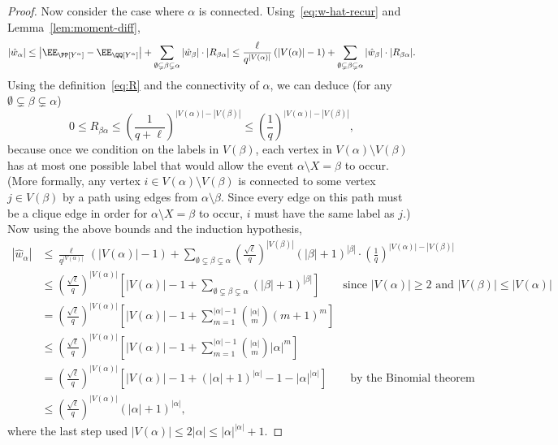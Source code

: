 \documentclass{article}
\begin{document}
\begin{proof}
Now consider the case where $\alpha$ is connected. Using~\eqref{eq:w-hat-recur} and Lemma~\ref{lem:moment-diff},
\[ |\hat{w}_\alpha| \le \left|\EE_\PP[Y^\alpha] - \EE_\QQ[Y^\alpha]\right| + \sum_{\emptyset \subsetneq \beta \subsetneq \alpha} |\hat{w}_\beta| \cdot |R_{\beta\alpha}|
\le \frac{\ell}{q^{|V(\alpha)|}} \, (|V(\alpha)|-1) + \sum_{\emptyset \subsetneq \beta \subsetneq \alpha} |\hat{w}_\beta| \cdot |R_{\beta\alpha}|. \]
Using the definition~\eqref{eq:R} and the connectivity of $\alpha$, we can deduce (for any $\emptyset \subsetneq \beta \subsetneq \alpha$)
\[ 0 \le R_{\beta\alpha} \le \left(\frac{1}{q+\ell}\right)^{|V(\alpha)| - |V(\beta)|} \le \left(\frac{1}{q}\right)^{|V(\alpha)| - |V(\beta)|}, \]
because once we condition on the labels in $V(\beta)$, each vertex in $V(\alpha) \setminus V(\beta)$ has at most one possible label that would allow the event $\alpha \setminus X = \beta$ to occur. (More formally, any vertex $i \in V(\alpha) \setminus V(\beta)$ is connected to some vertex $j \in V(\beta)$ by a path using edges from $\alpha \setminus \beta$. Since every edge on this path must be a clique edge in order for $\alpha \setminus X = \beta$ to occur, $i$ must have the same label as $j$.) Now using the above bounds and the induction hypothesis,
\begin{align*}
|\hat{w}_\alpha| &\le \frac{\ell}{q^{|V(\alpha)|}} \, (|V(\alpha)|-1) + \sum_{\emptyset \subsetneq \beta \subsetneq \alpha} \left(\frac{\sqrt\ell}{q}\right)^{|V(\beta)|}  (|\beta|+1)^{|\beta|} \cdot \left(\frac{1}{q}\right)^{|V(\alpha)| - |V(\beta)|} \\
&\le \left(\frac{\sqrt\ell}{q}\right)^{|V(\alpha)|} \left[|V(\alpha)|-1 + \sum_{\emptyset \subsetneq \beta \subsetneq \alpha} (|\beta|+1)^{|\beta|}\right] \qquad \text{since } |V(\alpha)| \ge 2 \text{ and } |V(\beta)| \le |V(\alpha)| \\
&= \left(\frac{\sqrt\ell}{q}\right)^{|V(\alpha)|} \left[|V(\alpha)|-1 + \sum_{m=1}^{|\alpha|-1} \binom{|\alpha|}{m} (m+1)^{m}\right] \\
&\le \left(\frac{\sqrt\ell}{q}\right)^{|V(\alpha)|} \left[|V(\alpha)|-1 + \sum_{m=1}^{|\alpha|-1} \binom{|\alpha|}{m} |\alpha|^{m}\right] \\
&= \left(\frac{\sqrt\ell}{q}\right)^{|V(\alpha)|} \left[|V(\alpha)|-1 + (|\alpha|+1)^{|\alpha|} - 1 - |\alpha|^{|\alpha|}\right] \qquad \text{by the Binomial theorem}\\
&\le \left(\frac{\sqrt\ell}{q}\right)^{|V(\alpha)|} (|\alpha|+1)^{|\alpha|},
\end{align*}
where the last step used $|V(\alpha)| \le 2|\alpha| \le |\alpha|^{|\alpha|} + 1$.
\end{proof}
\end{document}
